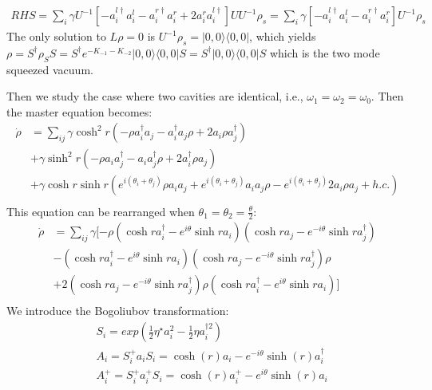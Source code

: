 \documentclass{article}
\begin{document}
\begin{equation}
\label{eq13}
\begin{split}
RHS=\sum_{i}\gamma U^{-1}[-a_{i}^{l\dagger}a_{i}^{l}-a_{i}^{r\dagger}a_{i}^{r}+2a_{i}^{r}a_{i}^{l\dagger}]UU^{-1}\rho_{s}=\sum_{i}\gamma[-a_{i}^{l\dagger}a_{i}^{l}-a_{i}^{r\dagger}a_{i}^{r}]U^{-1}\rho_{s}
\end{split}
\end{equation}
The only solution to $L\rho=0$ is $U^{-1}\rho_{s}=|0,0\rangle\langle0,0|$, which yields $\rho=S^{\dagger}\rho_S S=S^{\dagger}e^{-K_{-1}-K_{-2}}|0,0\rangle\langle0,0|S=S^{\dagger}|0,0\rangle\langle0,0|S$ which is the two mode squeezed vacuum.

Then we study the case where two cavities are identical, i.e., $\omega_1=\omega_2=\omega_0$. Then the master equation becomes:
\begin{equation}
\label{eq13}
\begin{split}
\dot{\rho}&=\sum_{ij}\gamma\cosh^{2}r(-\rho a_{i}^{\dagger}a_{j}-a_{i}^{\dagger}a_{j}\rho+2a_{i}\rho a_{j}^{\dagger})\\
&+\gamma\sinh^{2}r(-\rho a_{i}a_{j}^{\dagger}-a_{i}a_{j}^{\dagger}\rho+2a_{i}^{\dagger}\rho a_{j})\\
&+\gamma\cosh r\sinh r(e^{i(\theta_{i}+\theta_{j})}\rho a_{i}a_{j}+e^{i(\theta_{i}+\theta_{j})}a_{i}a_{j}\rho-e^{i(\theta_{i}+\theta_{j})}2a_{i}\rho a_{j}+h.c.)\\
\end{split}
\end{equation}
This equation can be rearranged when $\theta_1=\theta_2=\frac{\theta}{2}$:
\begin{equation}
\label{eq14}
\begin{split}
\dot{\rho}&=\sum_{ij}\gamma[-\rho(\cosh ra_{i}^{\dagger}-e^{i\theta}\sinh ra_{i})(\cosh ra_{j}-e^{-i\theta}\sinh ra_{j}^{\dagger})\\
&-(\cosh ra_{i}^{\dagger}-e^{i\theta}\sinh ra_{i})(\cosh ra_{j}-e^{-i\theta}\sinh ra_{j}^{\dagger})\rho\\
&+2(\cosh ra_{j}-e^{-i\theta}\sinh ra_{j}^{\dagger})\rho(\cosh ra_{i}^{\dagger}-e^{i\theta}\sinh ra_{i})]\\
\end{split}
\end{equation}
We introduce the Bogoliubov transformation:
\begin{equation}
\label{eq15}
\begin{split}
&S_{i}=exp(\frac{1}{2}\eta^{\star}a_{i}^{2}-\frac{1}{2}\eta a_{i}^{\dagger2})\\
&A_{i}=S_{i}^{+}a_{i}S_{i}=\cosh(r)a_{i}-e^{-i\theta}\sinh(r)a_{i}^{\dagger} \\
&A_{i}^{+}=S_{i}^{+}a_{i}^{+}S_{i}=\cosh(r)a_{i}^{+}-e^{i\theta}\sinh(r)a_{i}\\
\end{split}
\end{equation}
\end{document}
